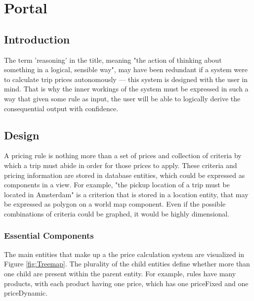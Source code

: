 \graphicspath{{Chapter5/Figs/Vector/}{Chapter5/Figs/}}

%
\chapter{Portal}

%
\section{Introduction}
The term 'reasoning' in the title, meaning "the action of thinking about something in a logical, sensible way", may have been redundant if a system were to calculate trip prices autonomously --- this system is designed with the user in mind. That is why the inner workings of the system must be expressed in such a way that given some rule as input, the user will be able to logically derive the consequential output with confidence.

%
\section{Design}
A pricing rule is nothing more than a set of prices and collection of criteria by which a trip must abide in order for those prices to apply. These criteria and pricing information are stored in database entities, which could be expressed as components in a view. For example, "the pickup location of a trip must be located in Amsterdam" is a criterion that is stored in a location entity, that may be expressed as polygon on a world map component. Even if the possible combinations of criteria could be graphed, it would be highly dimensional.

\subsection{Essential Components}
The main entities that make up a the price calculation system are visualized in Figure \ref{fig:Treemap}. The plurality of the child entities define whether more than one child are present within the parent entity. For example, rules have many products, with each product having one price, which has one priceFixed and one priceDynamic.

